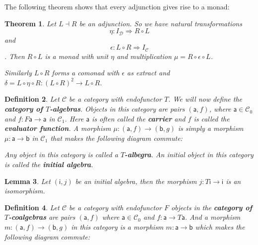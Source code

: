 \documentclass{article}
\newcommand{\cat}[1]{\mathcal{#1}} %
\newcommand{\cato}[1]{\cat{#1}_0} %
\newcommand{\catm}[1]{\cat{#1}_1} %
\newcommand{\ob}[1]{\mathsf{#1}} %
\newtheorem{theorem}{Theorem}
\newtheorem{lemma}[theorem]{Lemma}
\newtheorem{definition}[theorem]{Definition}
\begin{document}
The following theorem shows that every adjunction gives rise to a monad:

\begin{theorem}
	Let $L \dashv R$ be an adjunction. So we have natural transformations $$\eta: I_\cat{D} \Rightarrow R \circ L$$ and $$ \epsilon: L \circ R \Rightarrow I_\cat{C} $$.
	Then $R \circ L$ is a monad with unit $\eta$ and multiplication $\mu = R \circ \epsilon \circ L$.

	Similarly $L \circ R$ forms a comonad with $\epsilon$ as extract and $\delta = L \circ \eta \circ R: (L \circ R)^2 \rightarrow L \circ R$.
\end{theorem}

\begin{definition}
	Let $\cat{C}$ be a category with endofunctor $T$. We will now define the \textbf{category of $T$-algebras}.
	Objects in this category are pairs $(\ob{a}, f)$, where $\ob{a} \in \cato{C}$ and $f: F\ob{a} \rightarrow \ob{a}$ in $\catm{C}$.
	Here $\ob{a}$ is often called the \textbf{carrier} and $f$ is called the \textbf{evaluator function}.
	A morphism $\mu: (\ob{a}, f) \rightarrow (\ob{b}, g)$ is simply a morphism $\mu: \ob{a} \rightarrow \ob{b}$ in $\catm{C}$ that makes the following diagram commute:


	Any object in this category is called a \textbf{$T$-albegra}.
	An initial object in this category is called the \textbf{initial algebra}.
\end{definition}

\begin{lemma}
	Let $(\ob{i}, j)$ be an initial algebra, then the morphism $j: T\ob{i} \rightarrow \ob{i}$ is an isomorphism.
\end{lemma}

\begin{definition}
	Let $\cat{C}$ be a category with endofunctor $F$ objects in the \textbf{category of $T$-coalgebras} are pairs $(\ob{a}, f)$ where $\ob{a} \in \cato{C}$ and $f: \ob{a} \rightarrow T\ob{a}$.
	And a morphism $m: (\ob{a}, f) \rightarrow (\ob{b}, g)$ in this category is a morphism $m: \ob{a} \rightarrow \ob{b}$ which makes the following diagram commute:

\end{definition}
\end{document}

